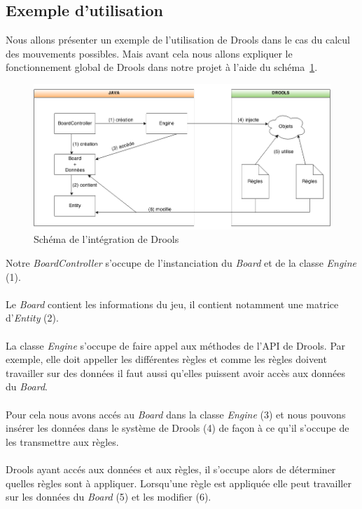 		\pagebreak
		\subsection{Exemple d'utilisation}

			Nous allons présenter un exemple de l'utilisation de Drools dans le cas du calcul des mouvements possibles. Mais avant cela nous allons expliquer le fonctionnement global de Drools dans notre projet à l'aide du schéma~\ref{fig:drools_global_utilisation}.

			\begin{figure}[!h]
			    \caption{Schéma de l'intégration de Drools}
			    \centerline{\includegraphics[scale=0.6]{images/architecture/drools_schema_use.png}}
			    \label{fig:drools_global_utilisation}
			\end{figure} 

			Notre {\itshape BoardController} s'occupe de l'instanciation du {\itshape Board} et de la classe {\itshape Engine} (1).
			\\ \\
			Le {\itshape Board} contient les informations du jeu, il contient notamment une matrice d'{\itshape Entity} (2).
			\\ \\
			La classe {\itshape Engine} s'occupe de faire appel aux méthodes de l'API de Drools. Par exemple, elle doit appeller les différentes règles et comme les règles doivent travailler sur des données il faut aussi qu'elles puissent avoir accès aux données du {\itshape Board}.
			\\ \\
			Pour cela nous avons accés au {\itshape Board} dans la classe {\itshape Engine} (3) et nous pouvons insérer les données dans le système de Drools (4) de façon à ce qu'il s'occupe de les transmettre aux règles.
			\\ \\
			Drools ayant accés aux données et aux règles, il s'occupe alors de déterminer quelles règles sont à appliquer. Lorsqu'une règle est appliquée elle peut travailler sur les données du {\itshape Board} (5) et les modifier (6). 

